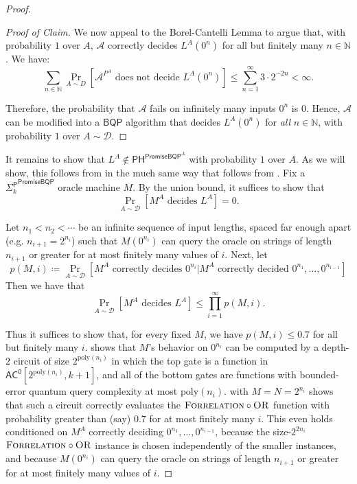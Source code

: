 \documentclass[10pt,a4paper]{article}
\newcommand{\Naturals}{\mathbb{N}}
\newcommand{\poly}{\mathrm{poly}}
\newcommand{\OR}{\normalfont\textsc{OR}}
\newcommand{\Forrelation}{\normalfont\textsc{Forrelation}}
\begin{document}
\begin{proof}
\begin{proof}[Proof of Claim]
We now appeal to the Borel-Cantelli Lemma to argue that, with probability $1$ over $A$, $\mathcal{A}$ correctly decides $L^A\left(0^{n}\right)$ for all but finitely many $n \in \Naturals$. We have:
\[
\sum_{n \in \Naturals} \Pr_{A\sim D}\left[\mathcal{A}^{P^A} \text{ does not decide } L^A\left(0^{n}\right)\right] \le \sum_{n=1}^{\infty} 3 \cdot 2^{-2n} < \infty.
\]

Therefore, the probability that $\mathcal{A}$ fails on infinitely many inputs $0^n$ is $0$. Hence, $\mathcal{A}$ can be modified into a $\mathsf{BQP}$ algorithm that decides $L^A\left(0^{n}\right)$ for \textit{all} $n \in \Naturals$, with probability $1$ over $A \sim \mathcal{D}$.
\end{proof}

It remains to show that $L^A \not\in \mathsf{PH}^{\mathsf{PromiseBQP}^A}$ with probability $1$ over $A$. As we will show, this follows from  in the much same way that  follows from . Fix a ${\mathsf{\Sigma}_k^\mathsf{P}}^\mathsf{PromiseBQP}$ oracle machine $M$. By the union bound, it suffices to show that
\[
\Pr_{A \sim \mathcal{D}}\left[M^A \text{ decides } L^A\right]=0.
\]

Let $n_1<n_2<\cdots$ be an infinite sequence of input lengths, spaced far enough apart (e.g. $n_{i+1}=2^{n_i}$) such that $M\left(0^{n_i}\right)$ can query the oracle on strings of length $n_{i+1}$ or greater for at most finitely many values of $i$. Next, let
\[
p(M,i)\coloneqq\Pr_{A \sim \mathcal{D}}\left[M^A \text{ correctly decides } 0^{n_i}|M^A \text{ correctly decided }0^{n_1},\dots,0^{n_{i-1}}\right]
\]
Then we have that
\[
\Pr_{A \sim \mathcal{D}}\left[M^A\text{ decides }L^A\right]\leq\prod_{i=1}^\infty p(M,i).
\]

\noindent Thus it suffices to show that, for every fixed $M$, we have $p(M,i)\leq 0.7$ for all but finitely many $i$.  shows that $M$'s behavior on $0^{n_i}$ can be computed by a depth-$2$ circuit of size $2^{\poly(n_i)}$ in which the top gate is a function in $\mathsf{AC^0}\left[2^{\poly(n_i)}, k+1\right]$, and all of the bottom gates are functions with bounded-error quantum query complexity at most $\poly(n_i)$.  with $M = N = 2^{n_i}$ shows that such a circuit correctly evaluates the $\Forrelation \circ \OR$ function with probability greater than (say) $0.7$ for at most finitely many $i$. This even holds conditioned on $M^A$ correctly deciding $0^{n_1},\ldots,0^{n_{i-1}}$, because the size-$2^{2n_i}$ $\Forrelation \circ \OR$ instance is chosen independently of the smaller instances, and because $M\left(0^{n_i}\right)$ can query the oracle on strings of length $n_{i+1}$ or greater for at most finitely many values of $i$.
\end{proof}
\end{document}
